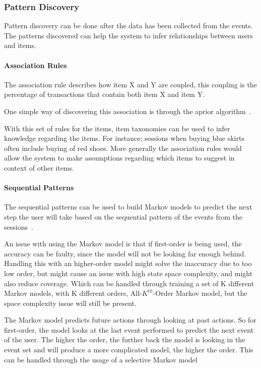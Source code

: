 \subsubsection{Pattern Discovery} %
    \label{par:pattern_discovery}
    Pattern discovery can be done after the data has been collected from the events.
    The patterns discovered can help the system to infer relationships between users and items.

\paragraph{Association Rules} %
    \label{subp:association_rules}
    The association rule describes how item X and Y are coupled, this coupling is the percentage of transactions that contain both item X and item Y.

    One simple way of discovering this association is through the aprior algorithm~\cite{Agrawal:1994:FAM:645920.672836}.

    With this set of rules for the items, item taxonomies can be used to infer knowledge regarding the items.
    For instance; sessions when buying blue skirts often include buying of red shoes.
    More generally the association rules would allow the system to make assumptions regarding which items to suggest in context of other items.
\paragraph{Sequential Patterns} %
    \label{subp:sequential_patterns}
    The sequential patterns can be used to build Markov models to predict the next step the user will take based on the sequential pattern of the events from the sessions~\cite{Deshpande:2004:SMM:990301.990304}.

    An issue with using the Markov model is that if first-order is being used, the accuracy can be faulty, since the model will not be looking far enough behind.
    Handling this with an higher-order model might solve the inaccuracy due to too low order, but might cause an issue with high state space complexity, and might also reduce coverage.
    Which can be handled through training a set of K different Markov models, with K different orders, All-$K^{th}$-Order Markov model, but the space complexity issue will still be present.

    The Markov model predicts future actions through looking at past actions.
    So for first-order, the model looks at the last event performed to predict the next event of the user.
    The higher the order, the further back the model is looking in the event set and will produce a more complicated model, the higher the order.
    This can be handled through the usage of a selective Markov model~\cite{Deshpande:2004:SMM:990301.990304}

